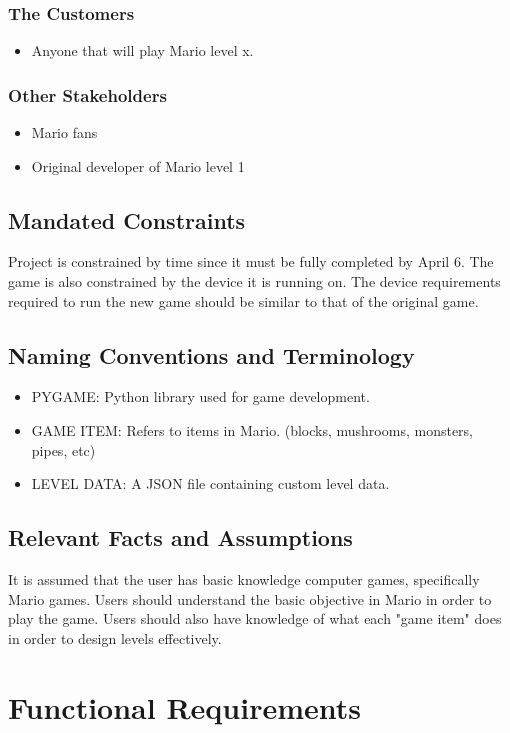 \documentclass[12pt, titlepage]{article}
\begin{document}
\subsubsection{The Customers}
\begin{itemize}
    \item Anyone that will play Mario level x.
\end{itemize}

\subsubsection{Other Stakeholders}
\begin{itemize}
    \item Mario fans
    \item Original developer of Mario level 1
\end{itemize}
\subsection{Mandated Constraints}
Project is constrained by time since it must be fully completed by April 6. The game is also constrained by the device it is running on. The device requirements required to run the new game should be similar to that of the original game.
\subsection{Naming Conventions and Terminology}

\begin{itemize}
    \item PYGAME: Python library used for game development.
    \item GAME ITEM: Refers to items in Mario. (blocks, mushrooms, monsters, pipes, etc)
    \item LEVEL DATA: A JSON file containing custom level data.
\end{itemize}

\subsection{Relevant Facts and Assumptions}
It is assumed that the user has basic knowledge computer games, specifically Mario games. Users should understand the basic objective in Mario in order to play the game. Users should also have knowledge of what each "game item" does in order to design levels effectively.

\section{Functional Requirements}
\end{document}
